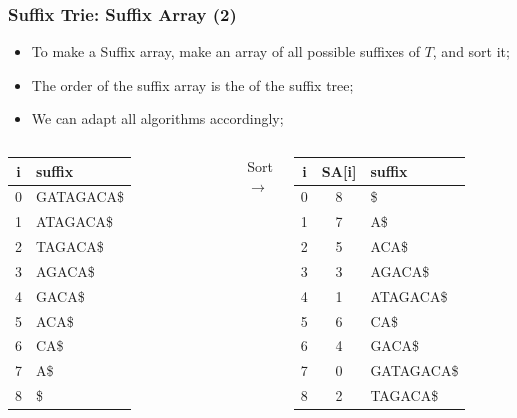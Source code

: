 \begin{frame}
  \frametitle{Suffix Trie: Suffix Array (2)}

  {\smaller

    \begin{itemize}
    \item To make a Suffix array, make an array of all possible
      suffixes of $T$, and sort it;
    \item The order of the suffix array is the
       of the suffix tree;
    \item We can adapt all algorithms accordingly;
    \end{itemize}

  \begin{columns}
    \begin{tabular}{c|l}
      i & suffix\\
      \hline
      0 & GATAGACA\$\\
      1 & ATAGACA\$\\
      2 & TAGACA\$\\
      3 & AGACA\$\\
      4 & GACA\$\\
      5 & ACA\$\\
      6 & CA\$\\
      7 & A\$\\
      8 & \$\\
    \end{tabular}
    Sort $\rightarrow$
    \begin{tabular}{c|c|l}
      i & SA[i] & suffix \\
      \hline
      0 & 8 & \$\\
      1 & 7 & A\$\\
      2 & 5 & ACA\$\\
      3 & 3 & AGACA\$\\
      4 & 1 & ATAGACA\$\\
      5 & 6 & CA\$\\
      6 & 4 & GACA\$\\
      7 & 0 & GATAGACA\$\\
      8 & 2 & TAGACA\$\\
    \end{tabular}
  \end{columns}
  }
\end{frame}

